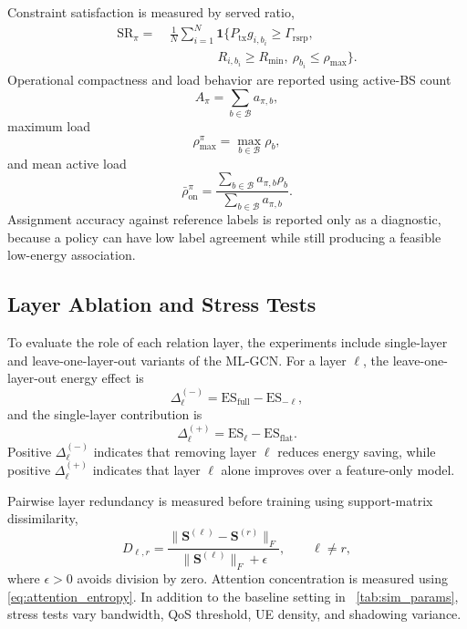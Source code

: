 \documentclass[journal]{IEEEtran}
\begin{document}
Constraint satisfaction is measured by served ratio,
\begin{align}
    \mathrm{SR}_{\pi}
    =&\ \frac{1}{N}\sum_{i=1}^{N}
    \mathbf{1}\Big\{
    P_{\mathrm{tx}}g_{i,b_i}\geq\Gamma_{\mathrm{rsrp}},
    \nonumber\\
    &\qquad\qquad
    R_{i,b_i}\geq R_{\min},
    \ \rho_{b_i}\leq\rho_{\max}
    \Big\}.
    \label{eq:served_ratio_metric}
\end{align}
Operational compactness and load behavior are reported using active-BS count
\begin{equation}
    A_{\pi}=\sum_{b\in\mathcal{B}}a_{\pi,b},
\end{equation}
maximum load
\begin{equation}
    \rho_{\max}^{\pi}=\max_{b\in\mathcal{B}}\rho_b,
\end{equation}
and mean active load
\begin{equation}
    \bar{\rho}_{\mathrm{on}}^{\pi}
    =
    \frac{\sum_{b\in\mathcal{B}}a_{\pi,b}\rho_b}
    {\sum_{b\in\mathcal{B}}a_{\pi,b}}.
\end{equation}
Assignment accuracy against reference labels is reported only as a diagnostic,
because a policy can have low label agreement while still producing a feasible
low-energy association.

\subsection{Layer Ablation and Stress Tests}
To evaluate the role of each relation layer, the experiments include
single-layer and leave-one-layer-out variants of the ML-GCN. For a layer
$\ell$, the leave-one-layer-out energy effect is
\begin{equation}
    \Delta_{\ell}^{(-)}
    =
    \mathrm{ES}_{\mathrm{full}}
    -
    \mathrm{ES}_{-\ell},
    \label{eq:leave_one_out_metric}
\end{equation}
and the single-layer contribution is
\begin{equation}
    \Delta_{\ell}^{(+)}
    =
    \mathrm{ES}_{\ell}
    -
    \mathrm{ES}_{\mathrm{flat}}.
    \label{eq:single_layer_metric}
\end{equation}
Positive $\Delta_{\ell}^{(-)}$ indicates that removing layer $\ell$ reduces
energy saving, while positive $\Delta_{\ell}^{(+)}$ indicates that layer
$\ell$ alone improves over a feature-only model.

Pairwise layer redundancy is measured before training using support-matrix
dissimilarity,
\begin{equation}
    D_{\ell,r}
    =
    \frac{\|\mathbf{S}^{(\ell)}-\mathbf{S}^{(r)}\|_F}
    {\|\mathbf{S}^{(\ell)}\|_F+\epsilon},
    \qquad \ell\neq r,
    \label{eq:layer_dissimilarity}
\end{equation}
where $\epsilon>0$ avoids division by zero. Attention concentration is measured
using \eqref{eq:attention_entropy}. In addition to the baseline setting in ~\ref{tab:sim_params}, stress tests vary bandwidth, QoS threshold, UE density, and shadowing variance.
\end{document}
